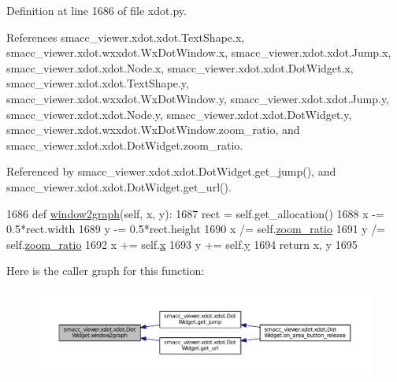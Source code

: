 Definition at line 1686 of file xdot.\+py.



References smacc\+\_\+viewer.\+xdot.\+xdot.\+Text\+Shape.\+x, smacc\+\_\+viewer.\+xdot.\+wxxdot.\+Wx\+Dot\+Window.\+x, smacc\+\_\+viewer.\+xdot.\+xdot.\+Jump.\+x, smacc\+\_\+viewer.\+xdot.\+xdot.\+Node.\+x, smacc\+\_\+viewer.\+xdot.\+xdot.\+Dot\+Widget.\+x, smacc\+\_\+viewer.\+xdot.\+xdot.\+Text\+Shape.\+y, smacc\+\_\+viewer.\+xdot.\+wxxdot.\+Wx\+Dot\+Window.\+y, smacc\+\_\+viewer.\+xdot.\+xdot.\+Jump.\+y, smacc\+\_\+viewer.\+xdot.\+xdot.\+Node.\+y, smacc\+\_\+viewer.\+xdot.\+xdot.\+Dot\+Widget.\+y, smacc\+\_\+viewer.\+xdot.\+wxxdot.\+Wx\+Dot\+Window.\+zoom\+\_\+ratio, and smacc\+\_\+viewer.\+xdot.\+xdot.\+Dot\+Widget.\+zoom\+\_\+ratio.



Referenced by smacc\+\_\+viewer.\+xdot.\+xdot.\+Dot\+Widget.\+get\+\_\+jump(), and smacc\+\_\+viewer.\+xdot.\+xdot.\+Dot\+Widget.\+get\+\_\+url().


\begin{DoxyCode}
1686     \textcolor{keyword}{def }\hyperlink{classsmacc__viewer_1_1xdot_1_1xdot_1_1DotWidget_aa5dfc398a1a7e23e74d0798f4523fdfb}{window2graph}(self, x, y):
1687         rect = self.get\_allocation()
1688         x -= 0.5*rect.width
1689         y -= 0.5*rect.height
1690         x /= self.\hyperlink{classsmacc__viewer_1_1xdot_1_1xdot_1_1DotWidget_a61694eba4278e9726bbef68a9ca3f594}{zoom\_ratio}
1691         y /= self.\hyperlink{classsmacc__viewer_1_1xdot_1_1xdot_1_1DotWidget_a61694eba4278e9726bbef68a9ca3f594}{zoom\_ratio}
1692         x += self.\hyperlink{classsmacc__viewer_1_1xdot_1_1xdot_1_1DotWidget_a828aac52a08d67c493696b074b6326da}{x}
1693         y += self.\hyperlink{classsmacc__viewer_1_1xdot_1_1xdot_1_1DotWidget_a1f5ee9fba6b3fe02772831d9bf6d7481}{y}
1694         \textcolor{keywordflow}{return} x, y
1695 
\end{DoxyCode}


Here is the caller graph for this function\+:
\nopagebreak
\begin{figure}[H]
\begin{center}
\leavevmode
\includegraphics[width=350pt]{classsmacc__viewer_1_1xdot_1_1xdot_1_1DotWidget_aa5dfc398a1a7e23e74d0798f4523fdfb_icgraph}
\end{center}
\end{figure}


